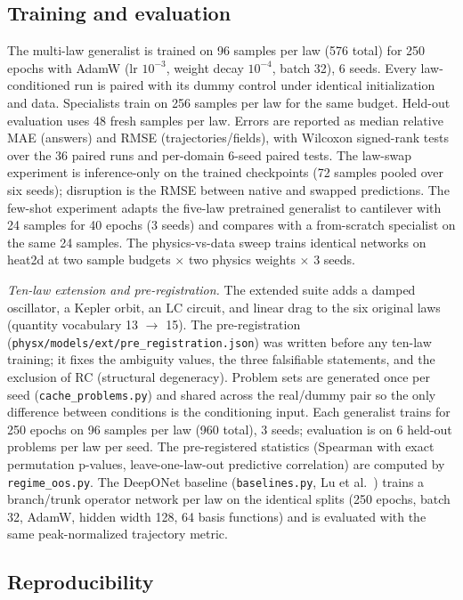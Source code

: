 \documentclass[11pt,a4paper]{article}
\begin{document}
\subsection{Training and evaluation}
\label{sec:train}

The multi-law generalist is trained on 96 samples per law (576 total) for 250
epochs with AdamW (lr $10^{-3}$, weight decay $10^{-4}$, batch 32), 6 seeds.
Every law-conditioned run is paired with its dummy control under identical
initialization and data. Specialists train on 256 samples per law for the
same budget. Held-out evaluation uses 48 fresh samples per law. Errors are
reported as median relative MAE (answers) and RMSE (trajectories/fields),
with Wilcoxon signed-rank tests over the 36 paired runs and per-domain
6-seed paired tests. The law-swap experiment is
inference-only on the trained checkpoints (72 samples pooled over six seeds);
disruption is the RMSE between native and swapped predictions. The
few-shot experiment adapts the five-law pretrained generalist to cantilever
with 24 samples for 40 epochs (3 seeds) and compares with a from-scratch
specialist on the same 24 samples. The physics-vs-data sweep trains
identical networks on heat2d at two sample budgets $\times$ two physics
weights $\times$ 3 seeds.

\emph{Ten-law extension and pre-registration.} The extended suite adds a
damped oscillator, a Kepler orbit, an LC circuit, and linear drag to the six
original laws (quantity vocabulary 13 $\to$ 15). The pre-registration
(\texttt{physx/models/ext/pre\_registration.json}) was written before any
ten-law training; it fixes the ambiguity values, the three falsifiable
statements, and the exclusion of RC (structural degeneracy). Problem sets
are generated once per seed (\texttt{cache\_problems.py}) and shared across
the real/dummy pair so the only difference between conditions is the
conditioning input. Each generalist trains for 250 epochs on 96 samples per
law (960 total), 3 seeds; evaluation is on 6 held-out problems per law per
seed. The pre-registered statistics (Spearman with exact permutation
p-values, leave-one-law-out predictive correlation) are computed by
\texttt{regime\_oos.py}. The DeepONet baseline
(\texttt{baselines.py}, Lu et al.~\cite{lu2021deeponet}) trains a branch/trunk
operator network per law on the identical splits (250 epochs, batch 32,
AdamW, hidden width 128, 64 basis functions) and is evaluated with the same
peak-normalized trajectory metric.

\subsection{Reproducibility}
\label{sec:repro}
\end{document}

